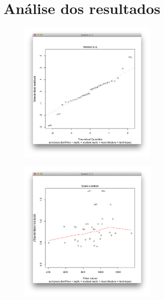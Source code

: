 \section{An\'alise dos resultados}
\label{sec:resultados}



\begin{figure}[t]
    \centering
    \includegraphics[width=0.6\textwidth]{images/grafico1.png}
    \caption{}
    \label{fig:grafico1}
\end{figure}

\begin{figure}[t]
    \centering
    \includegraphics[width=0.6\textwidth]{images/grafico2.png}
    \caption{}
    \label{fig:grafico2}
\end{figure}

